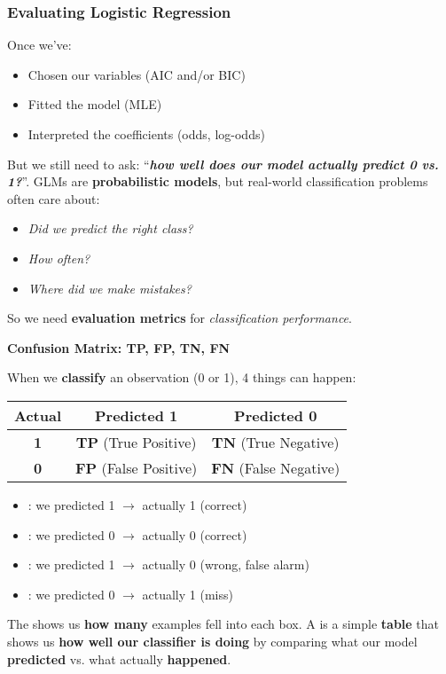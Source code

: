 \subsubsection{Evaluating Logistic Regression}

Once we've:
\begin{itemize}
    \item Chosen our variables (AIC and/or BIC)
    \item Fitted the model (MLE)
    \item Interpreted the coefficients (odds, log-odds)
\end{itemize}
But we still need to ask: ``\emph{\textbf{how well does our model actually predict 0 vs. 1?}}''. GLMs are \textbf{probabilistic models}, but real-world classification problems often care about:
\begin{itemize}
    \item \emph{Did we predict the right class?}
    \item \emph{How often?}
    \item \emph{Where did we make mistakes?}
\end{itemize}
So we need \textbf{evaluation metrics} for \emph{classification performance}.

\highspace
\begin{flushleft}
    \textcolor{Green3}{ \textbf{Confusion Matrix: TP, FP, TN, FN}}
\end{flushleft}
When we \textbf{classify} an observation (0 or 1), 4 things can happen:
\begin{table}[!htp]
    \centering
    \begin{tabular}{@{} c c c @{}}
        \toprule
        \textbf{Actual} & \textbf{Predicted 1}          & \textbf{Predicted 0} \\
        \midrule
        \textbf{1}      & \textbf{TP} (True Positive)   & \textbf{TN} (True Negative)   \\ [.3em]
        \textbf{0}      & \textbf{FP} (False Positive)  & \textbf{FN} (False Negative)  \\
        \bottomrule
    \end{tabular}
\end{table}
\begin{itemize}
    \item {}: we predicted 1 $\rightarrow$ actually 1 (correct)
    \item {}: we predicted 0 $\rightarrow$ actually 0 (correct)
    \item {}: we predicted 1 $\rightarrow$ actually 0 (wrong, false alarm)
    \item {}: we predicted 0 $\rightarrow$ actually 1 (miss)
\end{itemize}
The  shows us \textbf{how many} examples fell into each box. A  is a simple \textbf{table} that shows us \textbf{how well our classifier is doing} by comparing what our model \textbf{predicted} vs. what actually \textbf{happened}.

